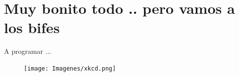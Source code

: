 \documentclass[bigger]{beamer}
\begin{document}
\section{Muy bonito todo .. pero vamos a los bifes}
\begin{frame}{A programar ...}
 \begin{figure}[h]
        \texttt{[image: Imagenes/xkcd.png]}
\end{figure}
\end{frame}
\end{document}
